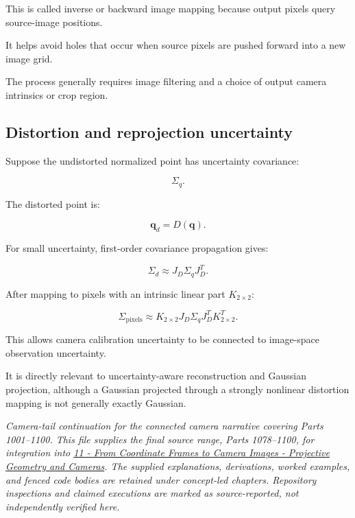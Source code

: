 This is called inverse or backward image mapping because output pixels query source-image positions.

It helps avoid holes that occur when source pixels are pushed forward into a new image grid.

The process generally requires image filtering and a choice of output camera intrinsics or crop region.

\subsection{Distortion and reprojection uncertainty}\label{02-foundations-ii-ch035-distortion-and-reprojection-uncertainty}

\hypertarget{02-foundations-ii-ch035-distortion-and-reprojection-uncertainty}{}

Suppose the undistorted normalized point has uncertainty covariance:

\[
 \Sigma_q.
\]

The distorted point is:

\[
 \mathbf q_d=D(\mathbf q).
\]

For small uncertainty, first-order covariance propagation gives:

\[
 \boxed{ \Sigma_d\approx J_D\Sigma_qJ_D^T }.
\]

After mapping to pixels with an intrinsic linear part \(K_{2\times2}\):

\[
 \boxed{ \Sigma_{\mathrm{pixels}} \approx K_{2\times2} J_D\Sigma_qJ_D^T K_{2\times2}^T }.
\]

This allows camera calibration uncertainty to be connected to image-space observation uncertainty.

It is directly relevant to uncertainty-aware reconstruction and Gaussian projection, although a Gaussian projected through a strongly nonlinear distortion mapping is not generally exactly Gaussian.

\emph{Camera-tail continuation for the connected camera narrative covering Parts 1001--1100. This file supplies the final source range, Parts 1078--1100, for integration into \hyperref[02-foundations-ii-ch032-a-coordinate-is-a-claim-about-a-frame]{11 - From Coordinate Frames to Camera Images - Projective Geometry and Cameras}. The supplied explanations, derivations, worked examples, and fenced code bodies are retained under concept-led chapters. Repository inspections and claimed executions are marked as source-reported, not independently verified here.}

